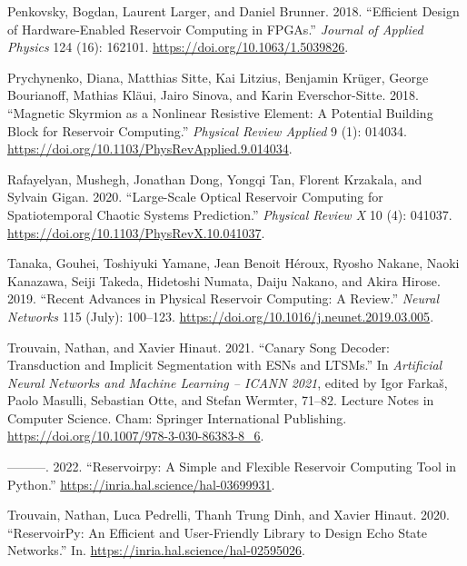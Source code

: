 \documentclass[
  11pt,
  a4paper,
]{article}
\newlength{\cslhangindent}
\newenvironment{CSLReferences}[2] %
 {\begin{list}{}{%
  \setlength{\itemindent}{0pt}
  \setlength{\leftmargin}{0pt}
  \setlength{\parsep}{0pt}
  \ifodd #1
   \setlength{\leftmargin}{\cslhangindent}
   \setlength{\itemindent}{-1\cslhangindent}
  \fi
  \setlength{\itemsep}{#2\baselineskip}}}
 {\end{list}}
\theoremstyle{plain}
\theoremstyle{remark}
\begin{document}
\begin{CSLReferences}{1}{0}
Penkovsky, Bogdan, Laurent Larger, and Daniel Brunner. 2018.
{``Efficient Design of Hardware-Enabled Reservoir Computing in
{FPGAs}.''} \emph{Journal of Applied Physics} 124 (16): 162101.
\url{https://doi.org/10.1063/1.5039826}.

Prychynenko, Diana, Matthias Sitte, Kai Litzius, Benjamin Krüger, George
Bourianoff, Mathias Kläui, Jairo Sinova, and Karin Everschor-Sitte.
2018. {``Magnetic {Skyrmion} as a {Nonlinear} {Resistive} {Element}: {A}
{Potential} {Building} {Block} for {Reservoir} {Computing}.''}
\emph{Physical Review Applied} 9 (1): 014034.
\url{https://doi.org/10.1103/PhysRevApplied.9.014034}.

Rafayelyan, Mushegh, Jonathan Dong, Yongqi Tan, Florent Krzakala, and
Sylvain Gigan. 2020. {``Large-{Scale} {Optical} {Reservoir} {Computing}
for {Spatiotemporal} {Chaotic} {Systems} {Prediction}.''} \emph{Physical
Review X} 10 (4): 041037.
\url{https://doi.org/10.1103/PhysRevX.10.041037}.

Tanaka, Gouhei, Toshiyuki Yamane, Jean Benoit Héroux, Ryosho Nakane,
Naoki Kanazawa, Seiji Takeda, Hidetoshi Numata, Daiju Nakano, and Akira
Hirose. 2019. {``Recent Advances in Physical Reservoir Computing: {A}
Review.''} \emph{Neural Networks} 115 (July): 100--123.
\url{https://doi.org/10.1016/j.neunet.2019.03.005}.

Trouvain, Nathan, and Xavier Hinaut. 2021. {``Canary {Song} {Decoder}:
{Transduction} and {Implicit} {Segmentation} with {ESNs} and {LTSMs}.''}
In \emph{Artificial {Neural} {Networks} and {Machine} {Learning} --
{ICANN} 2021}, edited by Igor Farkaš, Paolo Masulli, Sebastian Otte, and
Stefan Wermter, 71--82. Lecture {Notes} in {Computer} {Science}. Cham:
Springer International Publishing.
\url{https://doi.org/10.1007/978-3-030-86383-8_6}.

---------. 2022. {``Reservoirpy: {A} {Simple} and {Flexible} {Reservoir}
{Computing} {Tool} in {Python}.''}
\url{https://inria.hal.science/hal-03699931}.

Trouvain, Nathan, Luca Pedrelli, Thanh Trung Dinh, and Xavier Hinaut.
2020. {``{ReservoirPy}: An {Efficient} and {User}-{Friendly} {Library}
to {Design} {Echo} {State} {Networks}.''} In.
\url{https://inria.hal.science/hal-02595026}.


\end{CSLReferences}
\end{document}
